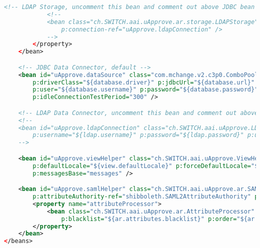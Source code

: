\begin{lstlisting}[language=xml]
            <!-- LDAP Storage, uncomment this bean and comment out above JDBC bean to activate LDAP -->
            <!--
            <bean class="ch.SWITCH.aai.uApprove.ar.storage.LDAPStorage"
                p:connection-ref="uApprove.ldapConnection" />
            -->
        </property>
    </bean>

    <!-- JDBC Data Connector, default -->
    <bean id="uApprove.dataSource" class="com.mchange.v2.c3p0.ComboPooledDataSource" destroy-method="close" depends-on="shibboleth.LogbackLogging"
        p:driverClass="${database.driver}" p:jdbcUrl="${database.url}"
        p:user="${database.username}" p:password="${database.password}"
        p:idleConnectionTestPeriod="300" />

    <!-- LDAP Data Connector, uncomment this bean and comment out above JDBC bean to activate LDAP -->
    <!--
    <bean id="uApprove.ldapConnection" class="ch.SWITCH.aai.uApprove.LDAPConnectionDetails"
        p:username="${ldap.username}" p:password="${ldap.password}" p:url="${ldap.url}" p:base="${ldap.base}" p:contextFactory="com.sun.jndi.ldap.LdapCtxFactory" p:authentification="simple" />
    -->

    <bean id="uApprove.viewHelper" class="ch.SWITCH.aai.uApprove.ViewHelper" init-method="initialize"
        p:defaultLocale="${view.defaultLocale}" p:forceDefaultLocale="${view.forceDefaultLocale}"
        p:messagesBase="messages" />

    <bean id="uApprove.samlHelper" class="ch.SWITCH.aai.uApprove.ar.SAMLHelper" init-method="initialize"
        p:attributeAuthority-ref="shibboleth.SAML2AttributeAuthority" p:relyingPartyConfigurationManager-ref="shibboleth.RelyingPartyConfigurationManager">
        <property name="attributeProcessor">
            <bean class="ch.SWITCH.aai.uApprove.ar.AttributeProcessor"
                p:blacklist="${ar.attributes.blacklist}" p:order="${ar.attributes.order}" />
        </property>
    </bean>
</beans>
\end{lstlisting}

